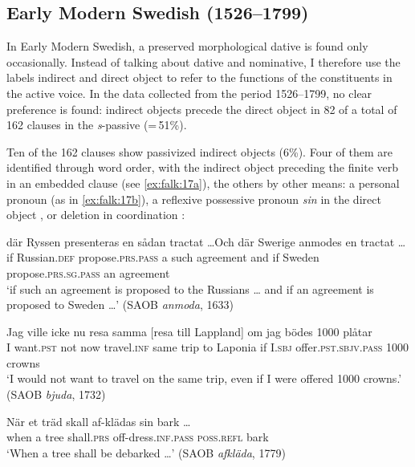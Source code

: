 \documentclass[output=paper]{langscibook}
\begin{document}
\subsection{Early Modern Swedish (1526–1799)}\label{sec:falk:3.4}\largerpage[2]


In Early Modern Swedish, a preserved morphological dative is found only occasionally. Instead of talking about dative and nominative, I therefore use the labels indirect and direct object to refer to the functions of the constituents in the active voice. In the data collected from the period 1526–1799, no clear preference is found: indirect objects precede the direct object in 82 of a total of 162 clauses in the \textit{s}{}-passive (=\,51\%).


Ten of the 162 clauses show passivized indirect objects (6\%). Four of them are identified through word order, with the indirect object preceding the finite verb in an embedded clause (see \ref{ex:falk:17a}), the others by other means: a personal pronoun (as in \ref{ex:falk:17b}), a reflexive possessive pronoun \textit{sin} in the direct object , or deletion in coordination :


\ea%
    \label{ex:falk:17}
\ea\label{ex:falk:17a}
\gll där  Ryssen      presenteras       en  sådan  tractat …Och    där    Swerige  anmodes            en  tractat …\\
if    Russian\textsc{.def}  propose\textsc{.prs}.\textsc{pass}    a  such    agreement     and    if         Sweden  propose\textsc{.prs}.\textsc{sg}.\textsc{pass}  an  agreement\\
\glt ‘if such an agreement is proposed to the Russians … and if an agreement is         proposed to Sweden …’ {(SAOB \textit{anmoda}, 1633)}

\ex\label{ex:falk:17b}
\gll Jag  ville      icke  nu    resa      samma [resa till Lappland] om  jag  bödes           1000  plåtar\\
I    want.\textsc{pst}  not  now  travel\textsc{.inf}  same     trip to Laponia  if  I.\textsc{sbj}   offer.\textsc{pst.sbjv}.\textsc{pass}  1000  crowns\\
\glt ‘I would not want to travel on the same trip, even if I were offered 1000 crowns.’ (SAOB \textit{bjuda}, 1732)

\ex\label{ex:falk:17c}
\gll När  et  träd  skall        af-klädas          sin        bark … \\
      when  a  tree  shall.\textsc{prs}  off-dress\textsc{.inf}.\textsc{pass}  \textsc{poss}.\textsc{refl}    bark\\
\glt ‘When a tree shall be debarked …’ (SAOB \textit{afkläda}, 1779)
\end{document}
